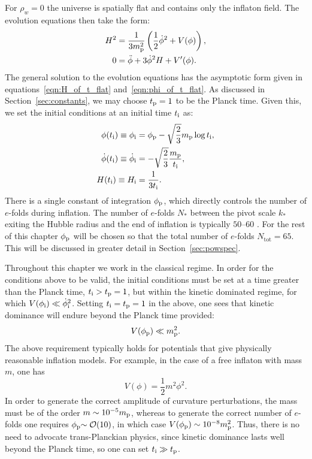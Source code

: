 For \(\rho_w=0\) the universe is spatially flat and contains only the inflaton field. The evolution equations then take the form:
%
\begin{align}
  H^2 
  &= 
  \frac{1}{3m_{\mathrm{p}}^2}
  \left(\frac{1}{2}\dot{\phi}^2 + V(\phi)\right),
  \label{eqn:Friedmann_eq} 
  \\
  0
  &= 
  \ddot{\phi} +3\dot{\phi}^2H + V^\prime(\phi).
  \label{eqn:Motion_eq_Scalar}
\end{align}
%
The general solution to the evolution equations has the asymptotic form given in equations~\eqref{eqn:H_of_t_flat} and~\eqref{eqn:phi_of_t_flat}. As discussed in Section~\ref{sec:constants}, we may choose \(t_{\mathrm{p}}=1\) to be the Planck time. Given this, we set the initial conditions at an initial time \(t_{\mathrm{i}}\) as:
%
\begin{align}
  \phi(t_{\mathrm{i}}) \equiv \phi_{\mathrm{i}}
  &= 
  \phi_{\mathrm{p}} - \sqrt{\frac{2}{3}}m_{\mathrm{p}}\log t_{\mathrm{i}}, 
  \label{eqn:phi_ic}
  \\
  \dot\phi(t_{\mathrm{i}}) 
  \equiv 
  \dot\phi_{\mathrm{i}}
  &= 
  -\sqrt{\frac{2}{3}}\frac{m_{\mathrm{p}}}{t_{\mathrm{i}}}, 
  \label{eqn:phid_ic}
  \\
  H(t_{\mathrm{i}}) 
  \equiv 
  H_{\mathrm{i}}
  &= 
  \frac{1}{3t_{\mathrm{i}}}. 
  \label{eqn:H_ic}
\end{align}
There is a single constant of integration \(\phi_{\mathrm{p}}\), which directly controls the number of \(e\)-folds during inflation. The number of \(e\)-folds \(N_*\) between the pivot scale \(k_*\) exiting the Hubble radius and the end of inflation is typically \(50\)--\(60\) \citep{planck_collaboration_planck_2013-1}. For the rest of this chapter \(\phi_{\mathrm{p}}\) will be chosen so that the total number of \(e\)-folds \(N_\mathrm{tot}=65\). This will be discussed in greater detail in Section~\ref{sec:powspec}.

Throughout this chapter we work in the classical regime. In order for the conditions above to be valid, the initial conditions must be set at a time greater than the Planck time, \(t_{\mathrm{i}} >t_{\mathrm{p}}=1\), but within the kinetic dominated regime, for which \(V(\phi_{\mathrm{i}}) \ll \dot\phi_{\mathrm{i}}^2\). Setting \(t_{\mathrm{i}}=t_{\mathrm{p}}=1\) in the above, one sees that kinetic dominance will endure beyond the Planck time provided:
%
\begin{equation}
  V(\phi_{\mathrm{p}}) \ll m_{\mathrm{p}}^2.
\end{equation}
%
The above requirement typically holds for potentials that give physically reasonable inflation models. For example, in the case of a free inflaton with mass \(m\), one has \[ V(\phi) = \frac{1}{2}m^2 \phi^2.\] In order to generate the correct amplitude of curvature perturbations, the mass must be of the order \(m\sim10^{-5}m_{\mathrm{p}}\), whereas to generate the correct number of \(e\)-folds one requires \(\phi_{\mathrm{p}}{\sim\mathcal{O}{\left(10\right)}}\), in which case \(V(\phi_{\mathrm{p}}) \sim 10^{-8} m_{\mathrm{p}}^2\).  Thus, there is no need to advocate trans-Planckian physics, since kinetic dominance lasts well beyond the Planck time, so one can set \(t_{\mathrm{i}} \gg t_{\mathrm{p}}\).


